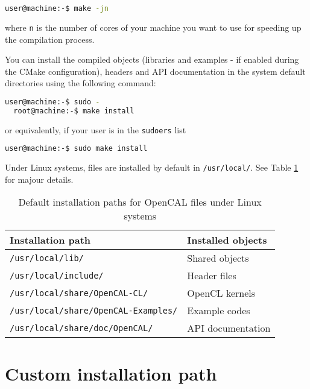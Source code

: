 \begin{lstlisting}[numbers=none,language=bash,label={ch:quickstart:ebuild}]
  user@machine:-$ make -jn
\end{lstlisting}
where \verb'n' is the number of cores of your machine you want to use
for speeding up the compilation process.

You can install the compiled objects (libraries and examples - if
enabled during the CMake configuration), headers and API documentation
in the system default directories using the following command:

\begin{lstlisting}[numbers=none,language=bash,label={ch:quickstart:install}]
  user@machine:-$ sudo -
  root@machine:-$ make install
\end{lstlisting}

\noindent or equivalently, if your user is in the \texttt{sudoers} list

\begin{lstlisting}[numbers=none,language=bash,label={ch:quickstart:sudoinstall}]
  user@machine:-$ sudo make install
\end{lstlisting}

\noindent Under Linux systems, files are installed by default in
\texttt{/usr/local/}. See Table \ref{ch:ddefault_paths} for majour
details.

\begin{table}[]
  \centering
  \caption{Default installation paths for OpenCAL files under Linux systems}
  \label{ch:ddefault_paths}
  \begin{tabularx}{\textwidth}{ll}
    \hline
    \textbf{Installation path} & \textbf{Installed objects}\\
    \hline\hline
    \verb'/usr/local/lib/'                    & Shared objects \\
    \verb'/usr/local/include/'                & Header files \\
    \verb'/usr/local/share/OpenCAL-CL/'       & OpenCL kernels \\
    \verb'/usr/local/share/OpenCAL-Examples/' & Example codes \\
    \verb'/usr/local/share/doc/OpenCAL/'      & API documentation \\
    \hline
  \end{tabularx}
\end{table}

\section{Custom installation path}

